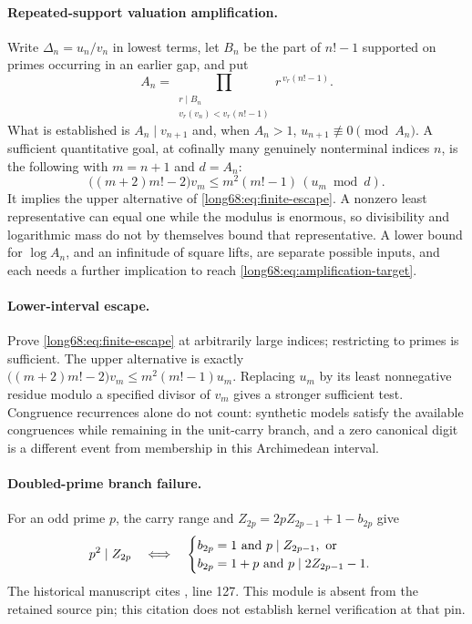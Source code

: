 \documentclass[11pt]{article}
\begin{document}
\paragraph{Repeated-support valuation amplification.}
Write $\Delta_n=u_n/v_n$ in lowest terms, let $B_n$ be the part of $n!-1$
supported on primes occurring in an earlier gap, and put
\[
 A_n=\prod_{\substack{r\mid B_n\\ v_r(v_n)<v_r(n!-1)}}r^{\,v_r(n!-1)} .
\]
What is established is $A_n\mid v_{n+1}$ and, when $A_n>1$,
$u_{n+1}\not\equiv0\pmod{A_n}$.  A sufficient quantitative goal, at cofinally
many genuinely nonterminal indices $n$, is the following with $m=n+1$ and
$d=A_n$:
\begin{equation}\label{long68:eq:amplification-target}
 \bigl((m+2)m!-2\bigr)v_m
 \le m^2(m!-1)\,(u_m\bmod d).
\end{equation}
It implies the upper alternative of \eqref{long68:eq:finite-escape}.  A nonzero
least representative can equal one while the modulus is enormous, so
divisibility and logarithmic mass do not by themselves bound that
representative.  A lower bound for $\log A_n$, and an infinitude of square
lifts, are separate possible inputs, and each needs a further implication to
reach \eqref{long68:eq:amplification-target}.

\paragraph{Lower-interval escape.}
Prove \eqref{long68:eq:finite-escape} at arbitrarily large indices; restricting to
primes is sufficient.  The upper alternative is exactly
$\bigl((m+2)m!-2\bigr)v_m\le m^2(m!-1)u_m$.  Replacing $u_m$ by its least
nonnegative residue modulo a specified divisor of $v_m$ gives a stronger
sufficient test.  Congruence recurrences alone do not count: synthetic models
satisfy the available congruences while remaining in the unit-carry branch,
and a zero canonical digit is a different event from membership in this
Archimedean interval.

\paragraph{Doubled-prime branch failure.}
For an odd prime $p$, the carry range and $Z_{2p}=2pZ_{2p-1}+1-b_{2p}$ give
\begin{equation}\label{long68:eq:doubled-prime}
 p^2\mid Z_{2p}
 \quad\Longleftrightarrow\quad
 \begin{cases}
 b_{2p}=1\ \hbox{and}\ p\mid Z_{2p-1},\ \hbox{or}\\
 b_{2p}=1+p\ \hbox{and}\ p\mid2Z_{2p-1}-1 .
 \end{cases}
\end{equation}
  The historical manuscript cites , line 127. This module is absent from the retained source pin; this citation does not establish kernel verification at that pin.
\end{document}
